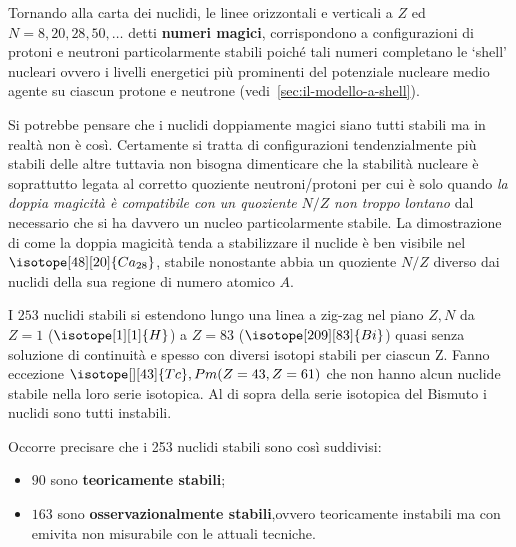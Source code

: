 Tornando alla carta dei nuclidi, le linee orizzontali e verticali a $Z$ ed $N = 8, 20, 28, 50, \dots$ detti \textbf{numeri magici},
corrispondono a configurazioni di protoni e neutroni particolarmente stabili
poiché tali numeri completano le `shell’ nucleari ovvero i livelli energetici più prominenti del potenziale nucleare
medio agente su ciascun protone e neutrone (vedi~\ref{sec:il-modello-a-shell}).

Si potrebbe pensare che i nuclidi doppiamente magici siano tutti stabili
ma in realtà non è così.
Certamente si tratta di configurazioni tendenzialmente più stabili delle altre tuttavia non bisogna dimenticare che
la stabilità nucleare è soprattutto legata al corretto quoziente
neutroni/protoni per cui è solo quando \emph{la doppia magicità è compatibile con
un quoziente} $N/Z$ \emph{non troppo lontano} dal necessario che si ha davvero un
nucleo particolarmente stabile.
La dimostrazione di come la doppia magicità tenda a stabilizzare il nuclide è ben visibile nel
$ \isotope[48][20]{\mathlarger{Ca}_{28}} $, stabile nonostante abbia un quoziente $N/Z$ diverso
dai nuclidi della sua regione di numero atomico $A$.

I $253$ nuclidi stabili si estendono lungo una linea a zig-zag nel piano $Z,N$ da $Z=1$ ($ \isotope[1][1]{\mathlarger{H}} $) 
a $Z=83$ ($ \isotope[209][83]{\mathlarger{Bi}} $) quasi senza soluzione di continuità e spesso con
diversi isotopi stabili per ciascun Z. Fanno eccezione $ \isotope[][43]{\mathlarger{Tc}},Pm(Z=43,Z=61) $ che non hanno alcun nuclide stabile nella
loro serie isotopica.
Al di sopra della serie isotopica del Bismuto i nuclidi sono tutti instabili.

Occorre precisare che i 253 nuclidi stabili sono così suddivisi:
\begin{itemize}
    \item $ 90 $ sono \textbf{teoricamente stabili};
    \item $ 163 $ sono \textbf{osservazionalmente stabili},ovvero teoricamente instabili ma con emivita non misurabile
    con le attuali tecniche.
\end{itemize}

